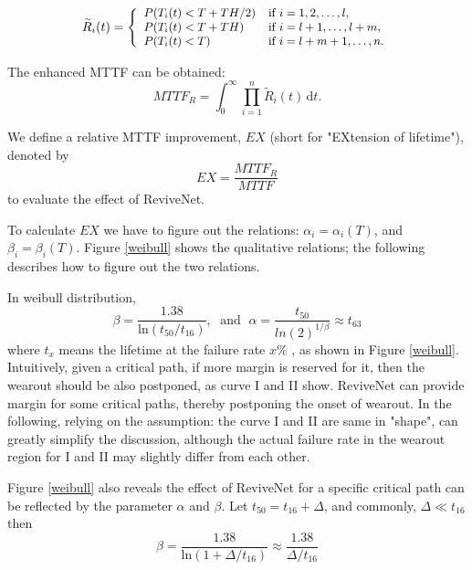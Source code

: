 \begin{equation}\label{new_term}
{\small
 \widetilde{R}_i(t)=\left\{
\begin{array}{ll}
P(T_i(t)<T+{TH}/{2}) & \mbox{if $i=1, 2, \ldots, l$,} \\
P(T_i(t)<T+ TH) & \mbox{if $i=l+1, \ldots, l+m$,} \\
P(T_i(t)<T) & \mbox{if $i=l+m+1, \ldots, n$.}
\end{array} \right.}
\end{equation}

The enhanced MTTF can be obtained:
\begin{equation}\label{mttfr}
MTTF_R = \int^\infty_0  \prod^n_{i=1} \widetilde{R}_i(t) \,\mbox{d}t.
\end{equation}

We define a relative MTTF improvement, $EX$ (short for "EXtension of lifetime"),  denoted by
\begin{equation}
  EX=\frac{MTTF_R}{MTTF}
\end{equation}
to evaluate the effect of ReviveNet.

To calculate $EX$ we have to figure out the relations: $\alpha_i=\alpha_i(T)$, and $\beta_i=\beta_i(T)$. Figure \ref{weibull} shows the qualitative relations; the following describes how to figure out the two relations.

In weibull distribution,
\begin{equation}\label{ab}
\beta=\frac{1.38}{\mbox{ln}(t_{50}/t_{16})},\;\mbox{ and }\; \alpha =
\frac{t_{50}}{ln(2)^{1/\beta}}\approx t_{63}
\end{equation}
where $t_x$ means the lifetime at the failure rate $x\%$ \cite{Handbook}, as shown in Figure \ref{weibull}. Intuitively, given a critical path, if more margin is reserved for it, then the wearout should be also postponed, as curve I and II show. ReviveNet can provide margin for some critical paths, thereby postponing the onset of wearout. In the following, relying on the assumption: the curve I and II are same in "shape", can greatly simplify the discussion, although the actual failure rate in the wearout region for I and II may slightly differ from each other.

Figure \ref{weibull} also reveals the effect of ReviveNet for a specific critical path can be reflected by the parameter $\alpha$ and $\beta$. Let $t_{50}= t_{16}+\Delta$, and commonly, $\Delta
\ll t_{16}$ then
\begin{equation}
  \beta=\frac{1.38}{\mbox{ln}(1+\Delta/t_{16})} \approx \frac{1.38}{\Delta/t_{16}}
\end{equation}

